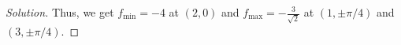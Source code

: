 \documentclass[12pt]{article}
\theoremstyle{definition}
\newenvironment{soln}{\begin{proof}[Solution]}{\end{proof}}
\begin{document}
\begin{enumerate}[leftmargin=*]
\begin{soln}
        Thus, we get $f_{\min} = -4$ at $(2,0)$ and $f_{\max} = -\frac{3}{\sqrt{2}}$ at $(1, \pm \pi/4)$ and $(3, \pm \pi/4)$.
    \end{soln}

\end{enumerate}



    
\end{document}
